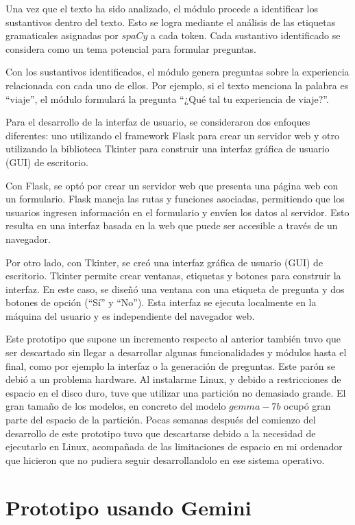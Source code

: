 Una vez que el texto ha sido analizado, el módulo procede a identificar los sustantivos dentro del texto. Esto se logra mediante el análisis de las etiquetas gramaticales asignadas por $spaCy$ a cada token. Cada sustantivo identificado se considera como un tema potencial para formular preguntas.

Con los sustantivos identificados, el módulo genera preguntas sobre la experiencia relacionada con cada uno de ellos. Por ejemplo, si el texto menciona la palabra es ``viaje'', el módulo formulará la pregunta ``¿Qué tal tu experiencia de viaje?''.

Para el desarrollo de la interfaz de usuario, se consideraron dos enfoques diferentes: uno utilizando el framework Flask para crear un servidor web y otro utilizando la biblioteca Tkinter para construir una interfaz gráfica de usuario (GUI) de escritorio.

Con Flask, se optó por crear un servidor web que presenta una página web con un formulario. Flask maneja las rutas y funciones asociadas, permitiendo que los usuarios ingresen información en el formulario y envíen los datos al servidor. Esto resulta en una interfaz basada en la web que puede ser accesible a través de un navegador.

Por otro lado, con Tkinter, se creó una interfaz gráfica de usuario (GUI) de escritorio. Tkinter permite crear ventanas, etiquetas y botones para construir la interfaz. En este caso, se diseñó una ventana con una etiqueta de pregunta y dos botones de opción (``Sí'' y ``No''). Esta interfaz se ejecuta localmente en la máquina del usuario y es independiente del navegador web.

Este prototipo que supone un incremento respecto al anterior también tuvo que ser descartado sin llegar a desarrollar algunas funcionalidades y módulos hasta el final, como por ejemplo la interfaz o la generación de preguntas. Este parón se debió a un problema hardware. Al instalarme Linux, y debido a restricciones de espacio en el disco duro, tuve que utilizar una partición no demasiado grande. El gran tamaño de los modelos, en concreto del modelo $gemma-7b$ ocupó gran parte del espacio de la partición. Pocas semanas después del comienzo del desarrollo de este prototipo tuvo que descartarse debido a la necesidad de ejecutarlo en Linux, acompañada de las limitaciones de espacio en mi ordenador que hicieron que no pudiera seguir desarrollandolo en ese sistema operativo. 

\section{Prototipo usando Gemini}


